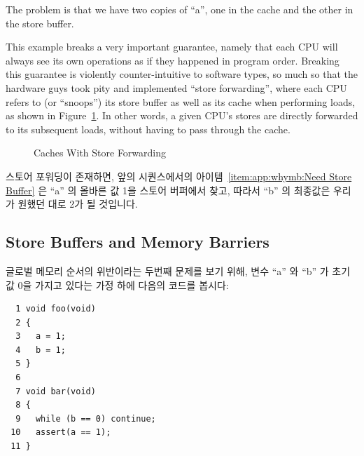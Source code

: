 The problem is that we have two copies of ``a'', one in the cache and
the other in the store buffer.

This example breaks a very important guarantee, namely that each CPU
will always see its own operations as if they happened in program order.
Breaking this guarantee is violently counter-intuitive to software types,
so much so
that the hardware guys took pity and implemented ``store forwarding'',
where each CPU refers to (or ``snoops'') its store buffer as well
as its cache when performing loads, as shown in
Figure~\ref{fig:app:whymb:Caches With Store Forwarding}.
In other words, a given CPU's stores are directly forwarded to its
subsequent loads, without having to pass through the cache.
\fi

\begin{figure}[htb]
\begin{center}
\end{center}
\caption{Caches With Store Forwarding}
\label{fig:app:whymb:Caches With Store Forwarding}
\end{figure}

스토어 포워딩이 존재하면, 앞의 시퀀스에서의 아이템~\ref{item:app:whymb:Need
Store Buffer} 은 ``a'' 의 올바른 값 1을 스토어 버퍼에서 찾고, 따라서 ``b'' 의
최종값은 우리가 원했던 대로 2가 될 것입니다.

\subsection{Store Buffers and Memory Barriers}
\label{sec:app:whymb:Store Buffers and Memory Barriers}

글로벌 메모리 순서의 위반이라는 두번째 문제를 보기 위해, 변수 ``a'' 와 ``b'' 가
초기값 0을 가지고 있다는 가정 하에 다음의 코드를 봅시다:

\vspace{5pt}
\begin{minipage}[t]{\columnwidth}
\small
\begin{verbatim}
  1 void foo(void)
  2 {
  3   a = 1;
  4   b = 1;
  5 }
  6
  7 void bar(void)
  8 {
  9   while (b == 0) continue;
 10   assert(a == 1);
 11 }
\end{verbatim}
\end{minipage}
\vspace{5pt}

